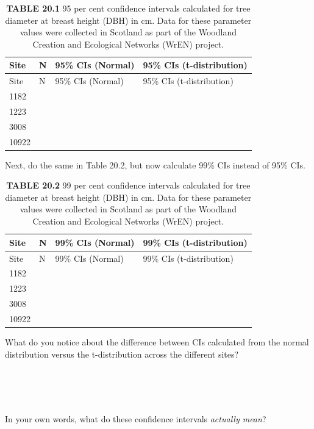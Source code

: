 \documentclass[
  openany]{krantz}
\begin{document}
\begin{longtable}[]{@{}llll@{}}
\caption{\textbf{TABLE 20.1} 95 per cent confidence intervals calculated for tree diameter at breast height (DBH) in cm. Data for these parameter values were collected in Scotland as part of the Woodland Creation and Ecological Networks (WrEN) project.}\tabularnewline
\toprule
Site & N & 95\% CIs (Normal) & 95\% CIs (t-distribution) \\
\midrule
\endfirsthead
\toprule
Site & N & 95\% CIs (Normal) & 95\% CIs (t-distribution) \\
\midrule
\endhead
1182 & & & \\
1223 & & & \\
3008 & & & \\
10922 & & & \\
\bottomrule
\end{longtable}

Next, do the same in Table 20.2, but now calculate 99\% CIs instead of 95\% CIs.

\begin{longtable}[]{@{}llll@{}}
\caption{\textbf{TABLE 20.2} 99 per cent confidence intervals calculated for tree diameter at breast height (DBH) in cm. Data for these parameter values were collected in Scotland as part of the Woodland Creation and Ecological Networks (WrEN) project.}\tabularnewline
\toprule
Site & N & 99\% CIs (Normal) & 99\% CIs (t-distribution) \\
\midrule
\endfirsthead
\toprule
Site & N & 99\% CIs (Normal) & 99\% CIs (t-distribution) \\
\midrule
\endhead
1182 & & & \\
1223 & & & \\
3008 & & & \\
10922 & & & \\
\bottomrule
\end{longtable}

What do you notice about the difference between CIs calculated from the normal distribution versus the t-distribution across the different sites?

\begin{verbatim}




\end{verbatim}

In your own words, what do these confidence intervals \emph{actually mean}?

\begin{verbatim}




\end{verbatim}
\end{document}

